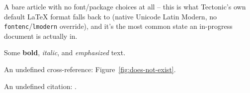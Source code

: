 \documentclass{article}
\begin{document}
A bare article with no font/package choices at all -- this is what Tectonic's own default
LaTeX format falls back to (native Unicode Latin Modern, no \texttt{fontenc}/\texttt{lmodern}
override), and it's the most common state an in-progress document is actually in.

Some \textbf{bold}, \textit{italic}, and \emph{emphasized} text.

An undefined cross-reference: Figure~\ref{fig:does-not-exist}.

An undefined citation: \cite{does-not-exist-2024}.
\end{document}
